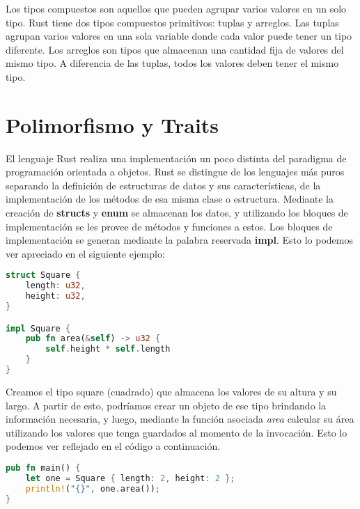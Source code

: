 Los tipos compuestos son aquellos que pueden agrupar varios valores en un solo tipo. Rust tiene dos tipos compuestos primitivos: tuplas y arreglos. Las tuplas agrupan varios valores en una sola variable donde cada valor puede tener un tipo diferente. Los arreglos son tipos que almacenan una cantidad fija de valores del mismo tipo. A diferencia de las tuplas, todos los valores deben tener el mismo tipo.

\section{Polimorfismo y Traits}

El lenguaje Rust realiza una implementación un poco distinta del paradigma de programación orientada a objetos. Rust se distingue de los lenguajes más puros separando la definición de estructuras de datos y sus características, de la implementación de los métodos de esa misma clase o estructura. Mediante la creación de \textbf{structs} y \textbf{enum} se almacenan los datos, y utilizando los bloques de implementación se les provee de métodos y funciones a estos. Los bloques de implementación se generan mediante la palabra reservada \textbf{impl}. Esto lo podemos ver apreciado en el siguiente ejemplo:

\begin{lstlisting}[language=Rust]
struct Square {
    length: u32,
    height: u32,
}

impl Square {
    pub fn area(&self) -> u32 {
        self.height * self.length
    }
}
\end{lstlisting}

Creamos el tipo square (cuadrado) que almacena los valores de su altura y su largo. A partir de esto, podríamos crear un objeto de ese tipo brindando la información necesaria, y luego, mediante la función asociada \textit{area} calcular su área utilizando los valores que tenga guardados al momento de la invocación. Esto lo podemos ver reflejado en el código a continuación.

\begin{lstlisting}[language=Rust]
pub fn main() {
    let one = Square { length: 2, height: 2 };
    println!("{}", one.area());
}
\end{lstlisting}

